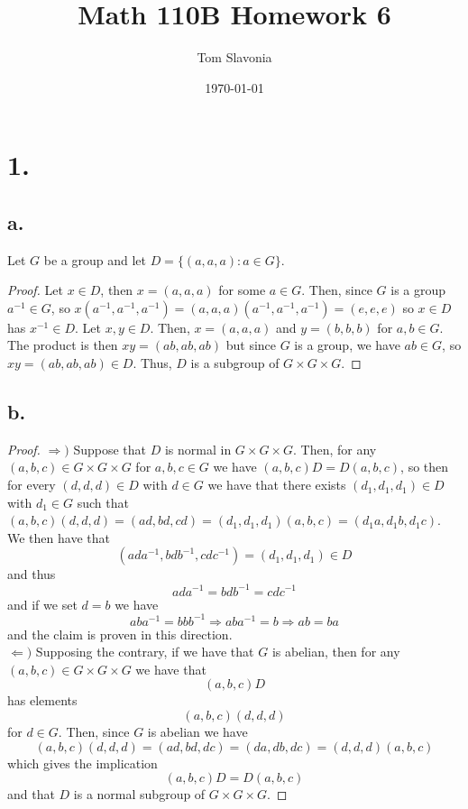 \documentclass{article}
\title{Math 110B Homework 6}
\author{Tom Slavonia}
\date{\today}
\begin{document}
\maketitle

\section*{1.}
\subsection*{a.}
Let $G$ be a group and let $D = \{(a, a, a) : a \in G\}$.
\begin{proof}
   Let $x \in D$, then $x = (a, a, a)$ for some $a \in G$. Then, since $G$ is a group $a^{-1} \in G$, so $x(a^{-1}, a^{-1}, a^{-1}) = (a, a, a)(a^{-1}, a^{-1}, a^{-1}) = (e, e, e)$ so $x \in D$ has $x^{-1} \in D$. Let $x, y \in D$. Then, $x = (a, a, a)$ and $y = (b, b, b)$ for $a, b \in G$. The product is then $xy = (ab, ab, ab)$ but since $G$ is a group, we have $ab \in G$, so $xy = (ab, ab, ab) \in D$. Thus, $D$ is a subgroup of $G \times G \times G$. 
\end{proof}
\subsection*{b.}
\begin{proof}
    $\Rightarrow)$ Suppose that $D$ is normal in $G \times G \times G$. Then, for any $(a, b, c) \in G \times G \times G$ for $a, b, c \in G$ we have $(a, b, c)D = D(a, b, c)$, so then for every $(d, d, d) \in D$ with $d \in G$ we have that there exists $(d_1, d_1, d_1) \in D$ with $d_1 \in G$ such that $(a, b, c)(d, d, d) = (ad, bd, cd) = (d_1, d_1, d_1)(a, b, c) = (d_1a, d_1b, d_1c)$. We then have that 
    \[
    (ada^{-1}, bdb^{-1}, cdc^{-1}) = (d_1, d_1, d_1) \in D    
    \]
    and thus \[
    ada^{-1} = bdb^{-1} = cdc^{-1}    
    \]
    and if we set $d = b$ we have 
    \[
    aba^{-1} = bbb^{-1} \Rightarrow aba^{-1} = b \Rightarrow ab = ba    
    \]
    and the claim is proven in this direction. \\
    $\Leftarrow)$ Supposing the contrary, if we have that $G$ is abelian, then for any $(a, b, c) \in G \times G \times G$ we have that \[
    (a, b, c)D    
    \]
    has elements \[
    (a, b, c)(d, d, d)    
    \]
    for $d \in G$. Then, since $G$ is abelian we have
    \[
    (a, b, c)(d, d, d) = (ad, bd, dc) = (da, db, dc) = (d, d, d)(a, b, c)    
    \]
    which gives the implication
    \[
    (a, b, c)D = D(a, b, c)    
    \]
    and that $D$ is a normal subgroup of $G \times G \times G$.  
\end{proof}
\end{document}
